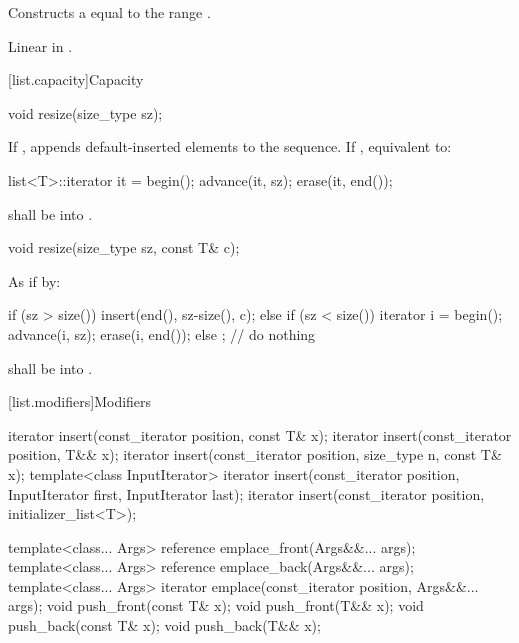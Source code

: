 \begin{itemdescr}
\pnum
\effects
Constructs a
equal to the range
.

\pnum
\complexity
Linear in
.
\end{itemdescr}

[list.capacity]{Capacity}

%
\begin{itemdecl}
void resize(size_type sz);
\end{itemdecl}

\begin{itemdescr}
\pnum
\effects
If ,
appends  default-inserted elements to the
sequence.
If , equivalent to:

\begin{codeblock}
list<T>::iterator it = begin();
advance(it, sz);
erase(it, end());
\end{codeblock}


\pnum
\requires {} shall be
 into .
\end{itemdescr}

%
\begin{itemdecl}
void resize(size_type sz, const T& c);
\end{itemdecl}

\begin{itemdescr}
\pnum
\effects
As if by:
\begin{codeblock}
if (sz > size())
  insert(end(), sz-size(), c);
else if (sz < size()) {
  iterator i = begin();
  advance(i, sz);
  erase(i, end());
}
else
  ;                 // do nothing
\end{codeblock}

\pnum
\requires {} shall be  into .
\end{itemdescr}

[list.modifiers]{Modifiers}

%
\begin{itemdecl}
iterator insert(const_iterator position, const T& x);
iterator insert(const_iterator position, T&& x);
iterator insert(const_iterator position, size_type n, const T& x);
template<class InputIterator>
  iterator insert(const_iterator position, InputIterator first,
                  InputIterator last);
iterator insert(const_iterator position, initializer_list<T>);

template<class... Args> reference emplace_front(Args&&... args);
template<class... Args> reference emplace_back(Args&&... args);
template<class... Args> iterator emplace(const_iterator position, Args&&... args);
void push_front(const T& x);
void push_front(T&& x);
void push_back(const T& x);
void push_back(T&& x);
\end{itemdecl}

